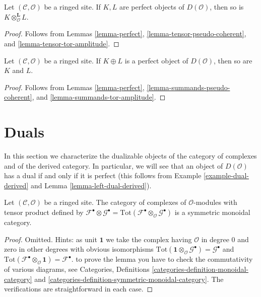 \begin{lemma}
\label{lemma-tensor-perfect}
Let $(\mathcal{C}, \mathcal{O})$ be a ringed site.
If $K, L$ are perfect objects of $D(\mathcal{O})$, then
so is $K \otimes_\mathcal{O}^\mathbf{L} L$.
\end{lemma}

\begin{proof}
Follows from
Lemmas \ref{lemma-perfect}, \ref{lemma-tensor-pseudo-coherent}, and
\ref{lemma-tensor-tor-amplitude}.
\end{proof}

\begin{lemma}
\label{lemma-summands-perfect}
Let $(\mathcal{C}, \mathcal{O})$ be a ringed site.
If $K \oplus L$ is a perfect object of $D(\mathcal{O})$, then
so are $K$ and $L$.
\end{lemma}

\begin{proof}
Follows from
Lemmas \ref{lemma-perfect}, \ref{lemma-summands-pseudo-coherent}, and
\ref{lemma-summands-tor-amplitude}.
\end{proof}














\section{Duals}
\label{section-duals}

\noindent
In this section we characterize the dualizable objects of
the category of complexes and of the derived category.
In particular, we will see that an object of $D(\mathcal{O})$
has a dual if and only if it is perfect (this follows from
Example \ref{example-dual-derived} and
Lemma \ref{lemma-left-dual-derived}).

\begin{lemma}
\label{lemma-symmetric-monoidal-cat-complexes}
Let $(\mathcal{C}, \mathcal{O})$ be a ringed site. The category of complexes
of $\mathcal{O}$-modules with tensor product defined by
$\mathcal{F}^\bullet \otimes \mathcal{G}^\bullet =
\text{Tot}(\mathcal{F}^\bullet \otimes_\mathcal{O} \mathcal{G}^\bullet)$
is a symmetric monoidal category.
\end{lemma}

\begin{proof}
Omitted. Hints: as unit $\mathbf{1}$ we take the complex having
$\mathcal{O}$ in degree $0$ and zero in other degrees with
obvious isomorphisms
$\text{Tot}(\mathbf{1} \otimes_\mathcal{O} \mathcal{G}^\bullet) =
\mathcal{G}^\bullet$ and
$\text{Tot}(\mathcal{F}^\bullet \otimes_\mathcal{O} \mathbf{1}) =
\mathcal{F}^\bullet$.
to prove the lemma you have to check the commutativity
of various diagrams, see Categories, Definitions
\ref{categories-definition-monoidal-category} and
\ref{categories-definition-symmetric-monoidal-category}.
The verifications are straightforward in each case.
\end{proof}

